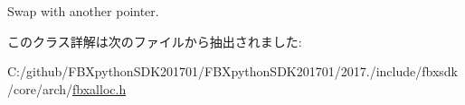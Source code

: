 Swap with another pointer. 



このクラス詳解は次のファイルから抽出されました\+:\begin{DoxyCompactItemize}
\item 
C\+:/github/\+F\+B\+Xpython\+S\+D\+K201701/\+F\+B\+Xpython\+S\+D\+K201701/2017./include/fbxsdk/core/arch/\hyperlink{fbxalloc_8h}{fbxalloc.\+h}\end{DoxyCompactItemize}
